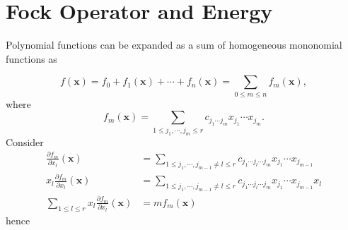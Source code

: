 \documentclass[aps,preprint]{revtex4}%
\begin{document}
\section{Fock Operator and Energy}

Polynomial functions can be expanded as a sum of homogeneous mononomial
functions as%

\begin{equation}
f\left(  \mathbf{x}\right)  =f_{0}+f_{1}\left(  \mathbf{x}\right)
+\cdots+f_{n}\left(  \mathbf{x}\right)  =%
{\textstyle\sum\limits_{0\leq m\leq n}}
f_{m}\left(  \mathbf{x}\right)  ,
\end{equation}
where
\begin{equation}
f_{m}\left(  \mathbf{x}\right)  =%
{\textstyle\sum\limits_{1\leq j_{1},\cdots,j_{m}\leq r}}
c_{j_{1}\cdots j_{m}}x_{j_{1}}\cdots x_{j_{m}}.
\end{equation}
Consider
\begin{align}
\frac{\partial f_{m}}{\partial x_{l}}\left(  \mathbf{x}\right)   &  =%
{\textstyle\sum\limits_{1\leq j_{1},\cdots,j_{m-1}\neq l\leq r}}
c_{j_{1}\cdots j_{l}\cdots j_{m}}x_{j_{1}}\cdots x_{j_{m-1}}\nonumber\\
x_{l}\frac{\partial f_{m}}{\partial x_{l}}\left(  \mathbf{x}\right)   &  =%
{\textstyle\sum\limits_{1\leq j_{1},\cdots,j_{m-1}\neq l\leq r}}
c_{j_{1}\cdots j_{l}\cdots j_{m}}x_{j_{1}}\cdots x_{j_{m-1}}x_{l}\nonumber\\%
{\textstyle\sum\limits_{1\leq l\leq r}}
x_{l}\frac{\partial f_{m}}{\partial x_{l}}\left(  \mathbf{x}\right)   &
=mf_{m}\left(  \mathbf{x}\right)
\end{align}
hence%
\end{document}
